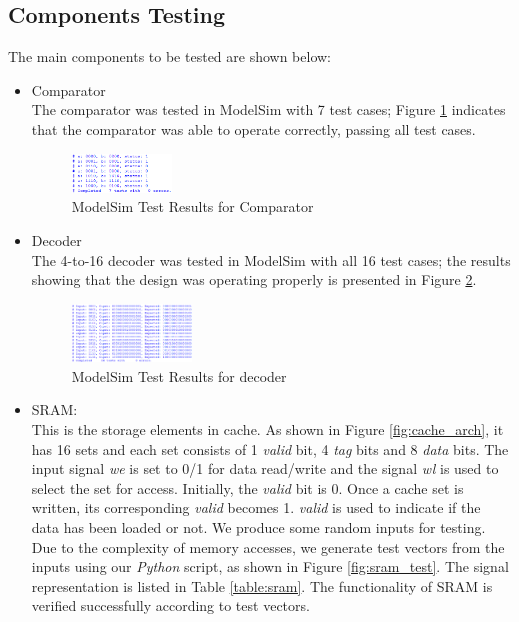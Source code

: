 \documentclass[conference]{IEEEtran}
\begin{document}
\subsection{Components Testing}\label{subsec:comp_test}
The main components to be tested are shown below:
\begin{itemize}
\item Comparator \\

The comparator was tested in ModelSim with 7 test cases; Figure \ref{fig:comp_test} indicates that the comparator was able to operate correctly, passing all test cases.

\begin{figure}[h!]
  \centering
    \includegraphics[width=0.25\textwidth]{comp_test}
  \caption{ModelSim Test Results for Comparator}
  \label{fig:comp_test}
\end{figure}

\item Decoder \\
The 4-to-16 decoder was tested in ModelSim with all 16 test cases; the results showing that the design was operating properly is presented in Figure \ref{fig:decoder_test}.

\begin{figure}[h!]
  \centering
    \includegraphics[width=0.3\textwidth]{decoder_test}
  \caption{ModelSim Test Results for decoder}
  \label{fig:decoder_test}
\end{figure}
 
\item SRAM: \\

This is the storage elements in cache. As shown in Figure \ref{fig:cache_arch}, it has 16 sets and each set consists of 1 \textit{valid} bit, 4 \textit{tag} bits and 8 \textit{data} bits. The input signal \textit{we} is set to 0/1 for data read/write and the signal \textit{wl} is used to select the set for access. Initially, the \textit{valid} bit is 0. Once a cache set is written, its corresponding \textit{valid} becomes 1. \textit{valid} is used to indicate if the data has been loaded or not. We produce some random inputs for testing. Due to the complexity of memory accesses, we generate test vectors from the inputs using our \textit{Python} script, as shown in Figure \ref{fig:sram_test}. The signal representation is listed in Table \ref{table:sram}. The functionality of SRAM is verified successfully according to test vectors.


\end{itemize}
\end{document}
